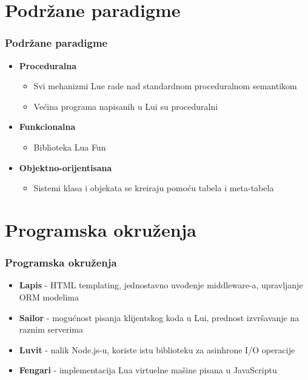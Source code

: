 \documentclass{beamer}
\begin{document}
\section{Podržane paradigme}
\begin{frame}
\frametitle{Podržane paradigme}

\begin{itemize}

\item \textbf{Proceduralna}
\begin{itemize}
\item Svi mehanizmi Lue rade nad standardnom proceduralnom semantikom
\item Većina programa napisanih u Lui su proceduralni
\end{itemize}

\item \textbf{Funkcionalna}
\begin{itemize}
\item Biblioteka Lua Fun
\end{itemize}

\item \textbf{Objektno-orijentisana}
\begin{itemize}
\item Sistemi klasa i objekata se kreiraju pomoću tabela i meta-tabela
\end{itemize}


\end{itemize}

\end{frame}



\section{Programska okruženja}
\begin{frame} 
\frametitle{Programska okruženja}

\begin{itemize}
\item \textbf{Lapis} - HTML templating, jednostavno uvođenje middleware-a, upravljanje ORM modelima 

\item \textbf{Sailor} - mogućnost pisanja klijentskog koda u Lui, prednost izvršavanje na raznim serverima

\item \textbf{Luvit} - nalik Node.js-u, koriste istu biblioteku za asinhrone I/O operacije

\item \textbf{Fengari} - implementacija Lua virtuelne mašine pisana u JavaScriptu

\end{itemize}

\end{frame}
\end{document}
